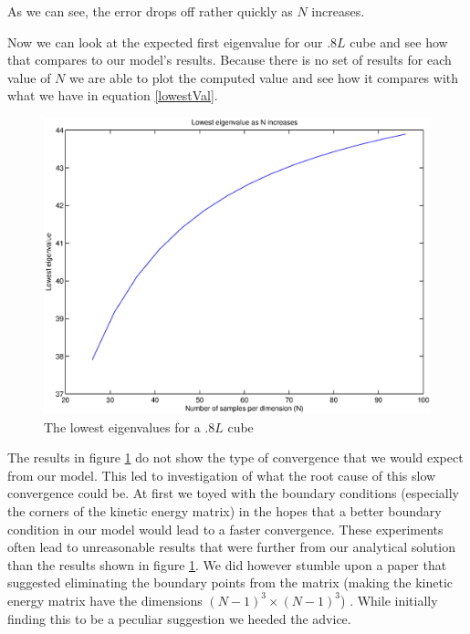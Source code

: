 \documentclass[authoryearcitations]{UoYCSproject}
\begin{document}
As we can see, the error drops off rather quickly as $N$ increases. 

Now we can look at the expected first eigenvalue
for our $.8L$ cube and see how that compares to our model's results. 
Because there is no set of results for each value of $N$ we are able
to plot the computed value and see how it compares with what we have in equation \ref{lowestVal}.

\begin{figure}
\centering
\includegraphics[scale=0.5]{figures/Mconverge.eps}
\caption{The lowest eigenvalues for a $.8L$ cube} 
\label{MconvergePlot}
\end{figure}

The results in figure \ref{MconvergePlot} do not show the type of convergence that we would expect from 
our model. This led to investigation of what the root cause of this slow convergence could be. At first
we toyed with the boundary conditions (especially the corners of the kinetic energy matrix) in the hopes
that a better boundary condition in our model would lead to a faster convergence. These experiments often lead to
unreasonable results that were further from our analytical solution than the results shown in figure \ref{MconvergePlot}.
We did however stumble upon a paper that suggested eliminating the boundary points from the matrix (making the kinetic
energy matrix have the dimensions $(N-1)^3 \times (N-1)^3$) \cite{datta}. While initially finding this to be a peculiar 
suggestion we heeded the advice.
\end{document}
